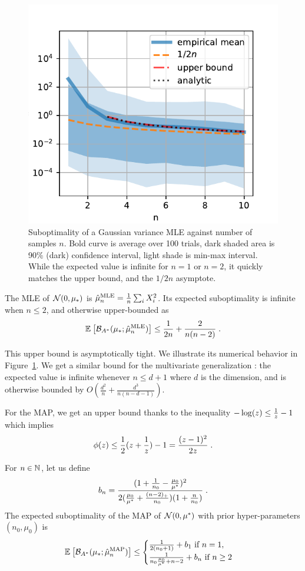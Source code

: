 \documentclass[twoside]{article}
\newcommand*{\expect}[2][]{\ensuremath{\mathbb{E}_{#1} \left[ #2 \right] }} %
\newcommand{\logpart}{A}
\newcommand{\bregmanconj}{\cB_{\logpart^*}}
\begin{document}
\begin{figure}[ht]
	\centering
\includegraphics[width=.4\textwidth]{fewsamples.pdf}
	\caption{Suboptimality of a Gaussian variance MLE against number of samples $n$. Bold curve is average over 100 trials,  dark shaded area is 90\% (dark) confidence interval, light shade is min-max interval. 
		While the expected value is infinite for $n=1$ or $n=2$, it quickly matches the upper bound, and the $1/2n$ asymptote.
	}
	\label{fig:curves}
\end{figure}


\begin{theorem}
	The MLE of ${\mathcal N}(0,\mu_*)$ is $\hat \mu_n^\text{MLE} = \frac{1}{n} \sum_i X_i^2 $.
	Its expected suboptimality is infinite when $n\leq 2$, and otherwise upper-bounded as
	\begin{align}
		 \expect{\bregmanconj( \mu_*; \hat \mu_n^\text{MLE}) }
			\leq \inv{2n} +\frac{2}{n(n-2)} \; .
			\label{eq:MLE_rate}
	\end{align}
\end{theorem}

This upper bound is asymptotically tight.
We illustrate its numerical behavior in Figure~\ref{fig:curves}.
We get a similar bound for the multivariate generalization :
the expected value is infinite whenever $n \leq d+1$ where $d$ is the dimension, and is otherwise bounded by $O(\frac{d^2}{n} + \frac{d^3}{n(n-d-1)} )$.
  
For the MAP, we get an upper bound thanks to the inequality $ - \log(z) \leq \frac{1}{z} - 1$ which implies
\begin{align}
	\label{eq:log_bound} 
	\phi(z) \leq \frac{1}{2} (z + \frac{1}{z}) - 1 = \frac{(z-1)^2}{2 z} \; .
\end{align}

\begin{theorem}
 For $n\in \mathbb{N}$, let us  define
 \begin{align}
	b_n = \frac{(1 + \frac{1}{n_0} - \frac{\mu_0}{\mu^*})^2}{2 (\frac{\mu_0}{\mu^*}+\frac{(n-2)_+}{n_0})(1 + \frac{n}{n_0} )} \; .
 \end{align}
The expected suboptimality of the MAP of ${\mathcal N}(0,\mu^*)$ with prior hyper-parameters $(n_0,\mu_0)$ is
 \begin{equation}
	\expect{\bregmanconj( \mu_*; \hat \mu_n^\text{MAP})}
	\leq \begin{cases}
		\inv{2(n_0+1)}  +  b_1 \ \text{if}\ n=1,\\
		\frac{1}{n_0 \frac{\mu_0}{\mu^*} +n-2} + b_n \ \text{if}\ n\geq 2
	\end{cases}
	\label{eq:MAP_rate}
\end{equation}
\end{theorem}
\end{document}

